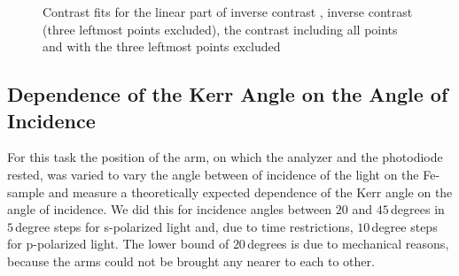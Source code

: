 \documentclass[a4paper,10pt]{scrartcl}
\begin{document}
\begin{figure}
{\label{fig:a2all}
}
\caption{Contrast fits for the linear part of inverse contrast , inverse contrast  (three leftmost points excluded), the contrast including all points  and  with the three leftmost points excluded \label{fig:kerrfit}}
\end{figure}

\subsection{Dependence of the Kerr Angle on the Angle of Incidence}

For this task the position of the arm, on which the analyzer and the photodiode rested, was varied to vary the angle between of incidence of the light on the Fe-sample and measure a theoretically expected dependence of the Kerr angle on the angle of incidence. We did this for incidence angles between $20$ and $45\,$degrees in $5\,$degree steps for s-polarized light and, due to time restrictions, $10\,$degree steps for p-polarized light. The lower bound of $20\,$degrees is due to mechanical reasons, because the arms could not be brought any nearer to each to other.
\end{document}
